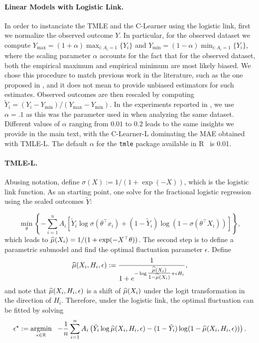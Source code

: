 \paragraph{Linear Models with Logistic Link.} In order to instanciate the TMLE and the C-Learner using the logistic link, first we normalize the observed outcome $Y$. In particular, for the observed dataset we compute $Y_{\max} = (1+\alpha)\max_{i:A_i = 1} \{Y_{i}\}$ and $Y_{\min} = (1-\alpha)\min_{i:A_i = 1} \{Y_{i}\}$, where the scaling parameter $\alpha$ accounts for the fact that for the observed dataset, both the empirical maximum and empirical minimum are most likely biased. We chose this procedure to match previous work in the literature, such as the one proposed in \citet{VanDerLaanRo11}, and it does not mean to provide unbiased estimators for such estimates. Observed outcomes are then rescaled by computing $\tilde Y_i = (Y_i - Y_{\min})/(Y_{\max}-Y_{\min})$. In the experiments reported in , we use $\alpha = .1$ as this was the parameter used in \citet{VanDerLaanRo11} when analyzing the same dataset. Different values of $\alpha$ ranging from $0.01$ to $0.2$ leads to the same insights we provide in the main text, with the C-Learner-L dominating the MAE obtained with TMLE-L. The default $\alpha$ for the \texttt{tmle} package available in R~\citep{gruber2012tmle} is 0.01. 

\paragraph{TMLE-L.} Abusing notation, define $\sigma(X) := 1/(1+\exp(-X))$, which is the logistic link function. As an starting point, one solve for the fractional logistic regression using the scaled outcomes $\tilde Y$:

\[
\min_{\theta} \left\{ - \sum_{i=1}^{n} A_i\left[ \tilde Y_i \log \sigma(\theta^\top x_i) + (1 - \tilde Y_i) \log (1 - \sigma(\theta^\top X_i)) \right] \right\},
\]
which leads to $\widehat{\mu}(X_i) = 1/(1+\exp(-X^\top \theta))$. The second step is to define a parametric submodel and find the optimal fluctuation parameter $\epsilon$. Define
$$
\widehat{\mu}(X_i,H_i,\epsilon) := \frac{1}{1+e^{-\log \tfrac{\widehat{\mu}(X_i)}{1-\widehat{\mu}(X_i)}+\epsilon H_i}},
$$
and note that $\widehat{\mu}(X_i,H_i,\epsilon)$ is a shift of $\widehat{\mu}(X_i)$ under the logit transformation in the direction of $H_i$. Therefore, under the logistic link, the optimal fluctuation can be fitted by solving
\begin{equation}
\label{eqn:targeting_logistic}
    \epsilon^\star:=\mathop{\rm argmin}_{\epsilon \in \mathbb{R}} 
    ~~-\frac{1}{n}\sum_{i=1}^n  A_i \left( 
    \tilde Y_i \log \widehat{\mu}(X_i,H_i,\epsilon) - (1-\tilde Y_i)\log (1-\widehat{\mu}(X_i,H_i,\epsilon))\right).
\end{equation}

